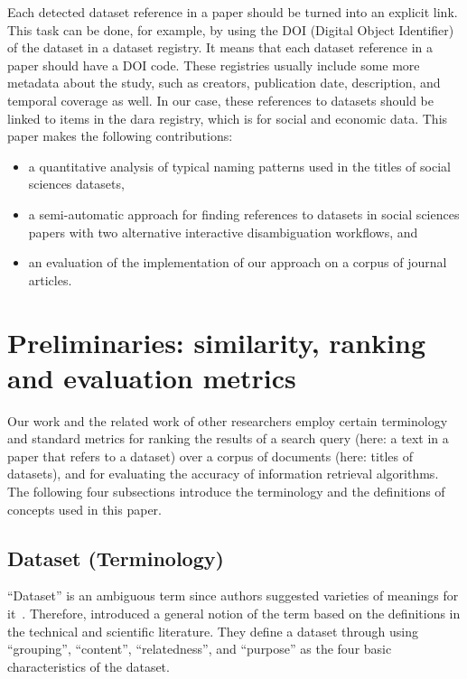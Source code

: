 \documentclass{IOS-Book-Article}
\newcommand{\dara}{\textsf{da\textbar ra}}
\begin{document}
Each detected dataset reference in a paper should be turned into an explicit link. This task can be done, for example, by using the DOI (Digital Object Identifier) of the dataset in a dataset registry. 
It means that each dataset reference in a paper should have a DOI code. These registries usually include some more metadata about the study, such as creators, publication date, description, and temporal coverage as well.
In our case, these references to datasets should be linked to items in the {\dara} registry, which is for social and economic data. This paper makes the following contributions:
\begin{itemize}
\item a quantitative analysis of typical naming patterns used in the titles of social sciences datasets,
\item a semi-automatic approach for finding references to datasets in social sciences papers with two alternative interactive disambiguation workflows, and
\item an evaluation of the implementation of our approach on a corpus of journal articles.  
\end{itemize}

\section{Preliminaries: similarity, ranking and evaluation metrics}
\label{sec:preliminaries}
Our work and the related work of other researchers employ certain terminology and standard metrics for ranking the results of a search query (here: a text in a paper that refers to a dataset) over a corpus of documents (here: titles of datasets), and for evaluating the accuracy of information retrieval algorithms.
The following four subsections introduce the terminology and the definitions of concepts used in this paper.

\subsection{Dataset (Terminology)}
\enquote{Dataset} is an ambiguous term since authors suggested varieties of meanings for it~\cite{peplerpreservation}.
Therefore, \citeauthor{renear2010definitions} introduced a general notion of the term based on the definitions in the technical and scientific literature.
They define a dataset through using \enquote{grouping}, \enquote{content}, \enquote{relatedness}, and \enquote{purpose} as the four basic characteristics of the dataset.
\end{document}
